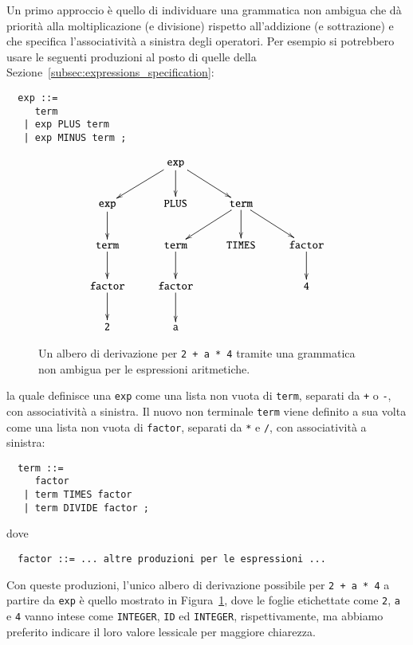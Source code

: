 Un primo approccio \`e quello di individuare una grammatica non
ambigua che d\`a priorit\`a alla moltiplicazione (e divisione) rispetto
all'addizione (e sottrazione) e che specifica l'associativit\`a a sinistra
degli operatori. Per esempio si potrebbero usare le seguenti produzioni
al posto di quelle della Sezione~\ref{subsec:expressions_specification}:
%
\begin{verbatim}
  exp ::=
     term
   | exp PLUS term
   | exp MINUS term ;
\end{verbatim}
%
\begin{figure}[t]
\[
  \xymatrix{
    & \mathtt{exp}\ar[ld]\ar[d]\ar[rd] \\
  \mathtt{exp}\ar[d] & \mathtt{PLUS} & \mathtt{term}\ar[ld]\ar[d]\ar[rd]\\
  \mathtt{term}\ar[d] & \mathtt{term}\ar[d] &
    \mathtt{TIMES} & \mathtt{factor}\ar[d] \\
  \mathtt{factor}\ar[d] & \mathtt{factor}\ar[d] & & \mathtt{4}\\
  \mathtt{2} & \mathtt{a}\\
  }
\]
\caption{Un albero di derivazione per \texttt{2 + a * 4} tramite una grammatica non ambigua per le espressioni aritmetiche.}
  \label{fig:no_ambiguity}
\end{figure}
%
la quale definisce una \texttt{exp} come una lista non vuota di \texttt{term},
separati da \texttt{+} o \texttt{-}, con associativit\`a a sinistra.
Il nuovo non terminale \texttt{term} viene definito a sua volta come una
lista non vuota di \texttt{factor}, separati da \texttt{*} e \texttt{/},
con associativit\`a a sinistra:
%
\begin{verbatim}
  term ::=
     factor
   | term TIMES factor
   | term DIVIDE factor ;
\end{verbatim}
%
dove
%
\begin{verbatim}
  factor ::= ... altre produzioni per le espressioni ...
\end{verbatim}
%
Con queste produzioni, l'unico albero di derivazione possibile
per \texttt{2 + a * 4} a partire da \texttt{exp} \`e quello mostrato
in Figura~\ref{fig:no_ambiguity}, dove le foglie etichettate come
\texttt{2}, \texttt{a} e \texttt{4} vanno intese come \texttt{INTEGER},
\texttt{ID} ed \texttt{INTEGER}, rispettivamente, ma abbiamo preferito
indicare il loro valore lessicale per maggiore chiarezza.


